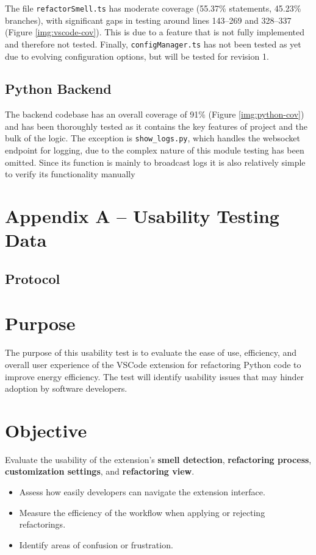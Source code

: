 \documentclass[12pt, titlepage]{article}
\begin{document}
The file \texttt{refactorSmell.ts} has moderate coverage (55.37\%
statements, 45.23\% branches), with significant gaps in testing
around lines 143–269 and 328–337 (Figure \ref{img:vscode-cov}). This
is due to a feature that is not fully implemented and therefore not
tested. Finally, \texttt{configManager.ts} has not been tested as yet
due to evolving configuration options, but will be tested for revision 1.

\subsection{Python Backend}
The backend codebase has an overall coverage of 91\% (Figure
\ref{img:python-cov}) and has been thoroughly tested as it contains
the key features of project and the bulk of the logic. The exception
is \texttt{show\_logs.py}, which handles the websocket endpoint for
logging, due to the complex nature of this module testing has been
omitted. Since its function is mainly to broadcast logs it is also
relatively simple to verify its functionality manually\\

\newpage
\section*{Appendix A -- Usability Testing Data} \label{appendix:usability}

\subsection*{Protocol}

\section*{Purpose}
The purpose of this usability test is to evaluate the ease of use,
efficiency, and overall user experience of the VSCode extension for
refactoring Python code to improve energy efficiency. The test will
identify usability issues that may hinder adoption by software developers.

\section*{Objective}
Evaluate the usability of the extension's \textbf{smell detection},
\textbf{refactoring process}, \textbf{customization settings}, and
\textbf{refactoring view}.

\begin{itemize}
  \item Assess how easily developers can navigate the extension interface.
  \item Measure the efficiency of the workflow when applying or
    rejecting refactorings.
  \item Identify areas of confusion or frustration.
\end{itemize}
\end{document}
